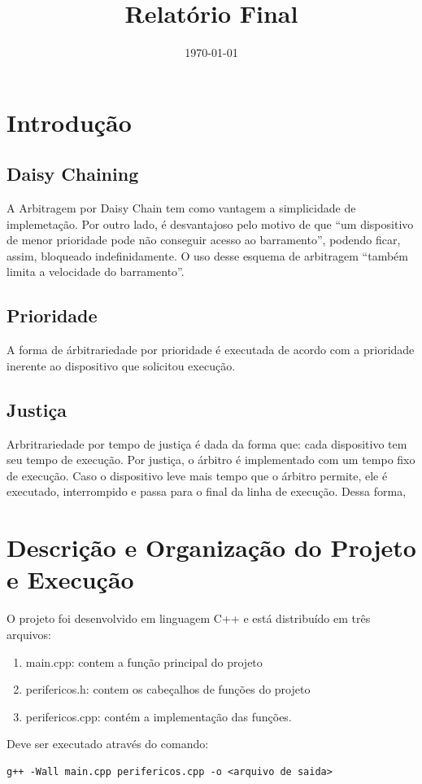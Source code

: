 \documentclass[12pt, oneside,a4paper, brazil]{abntex2}
\title{Relatório Final}
\date{\today}
\begin{document}

\frenchspacing
\imprimircapa
\imprimirfolhaderosto

\tableofcontents
\chapter{Introdução}
\section{Daisy Chaining}
A Arbitragem por Daisy Chain tem como vantagem a simplicidade de implemetação. Por outro lado, é desvantajoso pelo motivo de que ``um dispositivo de menor prioridade pode não conseguir acesso ao barramento''\cite{Silva}, podendo ficar, assim, bloqueado indefinidamente. O uso desse esquema de arbitragem ``também limita a velocidade do barramento''\cite{Silva}. 	
\section{Prioridade}
A forma de árbitrariedade por prioridade é executada de acordo com a prioridade inerente ao dispositivo que solicitou execução. 
\section{Justiça}
Arbritrariedade por tempo de justiça é dada da forma que: cada dispositivo tem seu tempo de execução. Por justiça, o árbitro é implementado com um tempo fixo de execução. Caso o dispositivo leve mais tempo que o árbitro permite, ele é executado, interrompido e passa para o final da linha de execução. Dessa forma, 


\chapter{Descrição e Organização do Projeto e Execução}
O projeto foi desenvolvido em linguagem C++ e está distribuído em três arquivos:
\begin{enumerate}
	\item main.cpp: contem a função principal do projeto
	\item perifericos.h: contem os cabeçalhos de funções do projeto
	\item perifericos.cpp: contém a implementação das funções.
\end{enumerate}
Deve ser executado através do comando: 
\begin{lstlisting}
g++ -Wall main.cpp perifericos.cpp -o <arquivo de saida>
\end{lstlisting}
\end{document}
